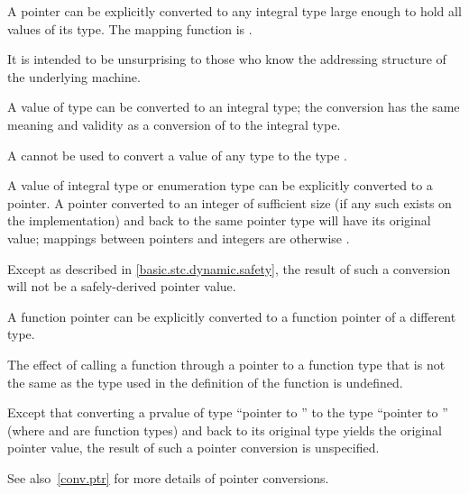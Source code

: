 \pnum
{}%
%
A pointer can be explicitly converted to any integral type large enough
to hold all values of its type.
%
The mapping function is .
\begin{note}
It is intended to be unsurprising to those who know the addressing
structure of the underlying machine.
\end{note} A value of type  can be converted to an integral
type; the conversion has the same meaning and validity as a conversion of
 to the integral type. \begin{note} A 
cannot be used to convert a value of any type to the type
. \end{note}

\pnum
{}%
%
A value of integral type or enumeration type can be explicitly converted
to a pointer. A pointer converted to an integer of sufficient size (if
any such exists on the implementation) and back to the same pointer type
will have its original value;
%
mappings between pointers and integers are otherwise
.
\begin{note} Except as described in \ref{basic.stc.dynamic.safety}, the result of
such a conversion will not be a safely-derived pointer value. \end{note}

\pnum
{}%
%
%
A function pointer can be explicitly converted
to a function pointer of a different type.
%
\begin{note}
The effect of calling a function through a pointer to a function
type that is not the same as the type used in the
definition of the function is undefined.
\end{note}
Except that converting
a prvalue of type ``pointer to '' to the type ``pointer to
'' (where  and  are function types) and
back to its original type yields the original pointer value, the result
of such a pointer conversion is unspecified.
\begin{note}
See also~\ref{conv.ptr} for more details of pointer conversions.
\end{note}

